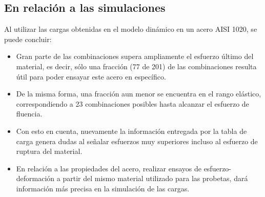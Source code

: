 \subsection{En relación a las simulaciones}
Al utilizar las cargas obtenidas en el modelo dinámico en un acero AISI 1020, se puede concluir:
\begin{itemize}
	\item Gran parte de las combinaciones supera ampliamente el esfuerzo último del material, es decir, sólo una fracción (77 de 201) de las combinaciones resulta útil para poder ensayar este acero en específico.
	\item De la misma forma, una fracción aun menor se encuentra en el rango elástico, correspondiendo a 23 combinaciones posibles hasta alcanzar el esfuerzo de fluencia.
	\item Con esto en cuenta, nuevamente la información entregada por la tabla de carga genera dudas al señalar esfuerzos muy superiores incluso al esfuerzo de ruptura del material.
	\item En relación a las propiedades del acero, realizar ensayos de esfuerzo-deformación a partir del mismo material utilizado para las probetas, dará información más precisa en la simulación de las cargas.
\end{itemize}



